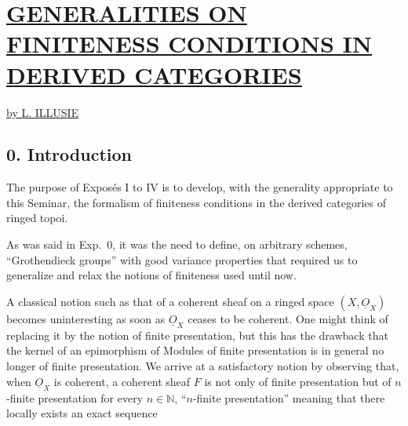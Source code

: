 %
\section*{\underline{\underline{GENERALITIES ON FINITENESS CONDITIONS IN}}\\[3pt] \underline{\underline{DERIVED CATEGORIES}}}
\begin{center}
\underline{by L. ILLUSIE}
\end{center}

\subsection*{0. Introduction}
The purpose of Exposés I to IV is to develop, with the generality appropriate to this Seminar, the formalism of finiteness conditions in the derived categories of ringed topoi.

As was said in Exp.\ 0, it was the need to define, on arbitrary schemes, ``Grothendieck groups'' with good variance properties that required us to generalize and relax the notions of finiteness used until now.

A classical notion such as that of a coherent sheaf on a ringed space \((X,\underline{O}_X)\) becomes uninteresting as soon as \(\underline{O}_X\) ceases to be coherent. One might think of replacing it by the notion of finite presentation, but this has the drawback that the kernel of an epimorphism of Modules of finite presentation is in general no longer of finite presentation. We arrive at a satisfactory notion by observing that, when \(\underline{O}_X\) is coherent, a coherent sheaf \(F\) is not only of finite presentation but of \(n\)-finite presentation for every \(n\in\mathbb N\), ``\(n\)-finite presentation'' meaning that there locally exists an exact sequence


